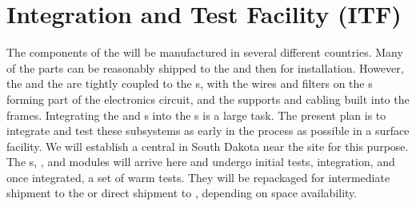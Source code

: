 \section{Integration and Test Facility (ITF)}
\label{sec:fdsp-tc-itf}



The components of the   will be manufactured in several different countries. Many of the parts can be reasonably shipped to the  and then  for installation. However, the   and the  are tightly coupled to the s, with the wires and filters on the s forming part of the electronics circuit, and the  supports and cabling built into the frames. Integrating the  and s into the s is a large task.  The present plan is to integrate and test these subsystems as early in the process as possible in a surface facility.  We will establish a central  in South Dakota near the  site for this purpose. The s, , and  modules will arrive here and undergo initial tests, integration, and once integrated, a set of warm tests. They will be repackaged for intermediate shipment to the  or direct shipment to , depending on space availability.

